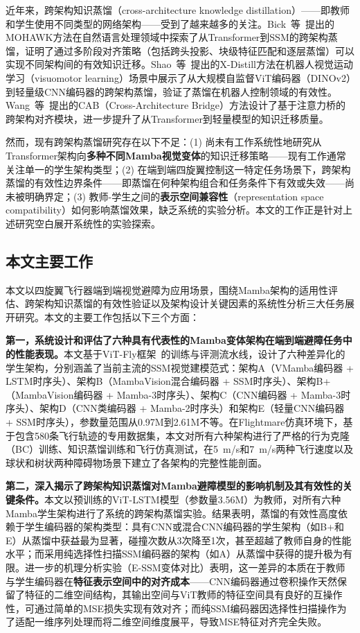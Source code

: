 \documentclass[12pt,a4paper]{article}
\numberwithin{equation}{section}
\numberwithin{figure}{section}
\numberwithin{table}{section}
\begin{document}
近年来，跨架构知识蒸馏（cross-architecture knowledge distillation）——即教师和学生使用不同类型的网络架构——受到了越来越多的关注。Bick~等~\cite{bick2024mohawk}提出的MOHAWK方法在自然语言处理领域中探索了从Transformer到SSM的跨架构蒸馏，证明了通过多阶段对齐策略（包括跨头投影、块级特征匹配和逐层蒸馏）可以实现不同架构间的有效知识迁移。Shao~等~\cite{shao2025xdistill}提出的X-Distill方法在机器人视觉运动学习（visuomotor learning）场景中展示了从大规模自监督ViT编码器（DINOv2）到轻量级CNN编码器的跨架构蒸馏，验证了蒸馏在机器人控制领域的有效性。Wang~等~\cite{wang2025cab}提出的CAB（Cross-Architecture Bridge）方法设计了基于注意力桥的跨架构对齐模块，进一步提升了从Transformer到轻量模型的知识迁移质量。

然而，现有跨架构蒸馏研究存在以下不足：(1) 尚未有工作系统性地研究从Transformer架构向\textbf{多种不同Mamba视觉变体}的知识迁移策略——现有工作通常关注单一的学生架构类型；(2) 在端到端四旋翼控制这一特定任务场景下，跨架构蒸馏的有效性边界条件——即蒸馏在何种架构组合和任务条件下有效或失效——尚未被明确界定；(3) 教师-学生之间的\textbf{表示空间兼容性}（representation space compatibility）如何影响蒸馏效果，缺乏系统的实验分析。本文的工作正是针对上述研究空白展开系统性的实验探索。

\subsection{本文主要工作}

本文以四旋翼飞行器端到端视觉避障为应用场景，围绕Mamba架构的适用性评估、跨架构知识蒸馏的有效性验证以及架构设计关键因素的系统性分析三大任务展开研究。本文的主要工作包括以下三个方面：

\textbf{第一，系统设计和评估了六种具有代表性的Mamba变体架构在端到端避障任务中的性能表现。}本文基于ViT-Fly框架~\cite{bhattacharya2024vitfly}的训练与评测流水线，设计了六种差异化的学生架构，分别涵盖了当前主流的SSM视觉建模范式：架构A（VMamba编码器 + LSTM时序头）、架构B（MambaVision混合编码器 + SSM时序头）、架构B+（MambaVision编码器 + Mamba-3时序头）、架构C（CNN编码器 + Mamba-3时序头）、架构D（CNN类编码器 + Mamba-2时序头）和架构E（轻量CNN编码器 + SSM时序头），参数量范围从0.97M到2.61M不等。在Flightmare仿真环境下，基于包含580条飞行轨迹的专用数据集，本文对所有六种架构进行了严格的行为克隆（BC）训练、知识蒸馏训练和飞行仿真测试，在5~m/s和7~m/s两种飞行速度以及球状和树状两种障碍物场景下建立了各架构的完整性能剖面。

\textbf{第二，深入揭示了跨架构知识蒸馏对Mamba避障模型的影响机制及其有效性的关键条件。}本文以预训练的ViT-LSTM模型（参数量3.56M）为教师，对所有六种Mamba学生架构进行了系统的跨架构蒸馏实验。结果表明，蒸馏的有效性高度依赖于学生编码器的架构类型：具有CNN或混合CNN编码器的学生架构（如B+和E）从蒸馏中获益最为显著，碰撞次数从3次降至1次，甚至超越了教师自身的性能水平；而采用纯选择性扫描SSM编码器的架构（如A）从蒸馏中获得的提升极为有限。进一步的机理分析实验（E-SSM变体对比）表明，这一差异的本质在于教师与学生编码器在\textbf{特征表示空间中的对齐成本}——CNN编码器通过卷积操作天然保留了特征的二维空间结构，其输出空间与ViT教师的特征空间具有良好的互操作性，可通过简单的MSE损失实现有效对齐；而纯SSM编码器因选择性扫描操作为了适配一维序列处理而将二维空间维度展平，导致MSE特征对齐完全失败。
\end{document}
